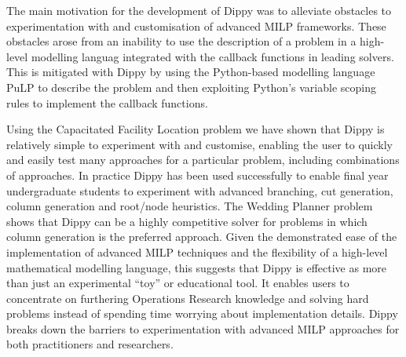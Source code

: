 The main motivation for the development of Dippy was to alleviate obstacles to experimentation with and customisation of advanced \ac{MILP} frameworks.
These obstacles arose from an inability to use the description of a problem in a high-level modelling languag integrated with the callback functions in leading solvers.
This is mitigated with Dippy by using the Python-based modelling language PuLP to describe the problem and then exploiting Python's variable scoping rules to implement the callback functions.

Using the Capacitated Facility Location problem we have shown that Dippy is relatively simple to experiment with and customise, enabling the user to quickly and easily test many approaches for a particular problem, including combinations of approaches.
In practice Dippy has been used successfully to enable final year undergraduate students to experiment with advanced branching, cut generation, column generation and root/node heuristics.
The Wedding Planner problem shows that Dippy can be a highly competitive solver for problems in which column generation is the preferred approach.
Given the demonstrated ease of the implementation of advanced \ac{MILP} techniques and the flexibility of a high-level mathematical modelling language, this suggests that Dippy is effective as more than just an experimental ``toy'' or educational tool.
It enables users to concentrate on furthering Operations Research knowledge and solving hard problems instead of spending time worrying about implementation details.
Dippy breaks down the barriers to experimentation with advanced \ac{MILP} approaches for both practitioners and researchers.


